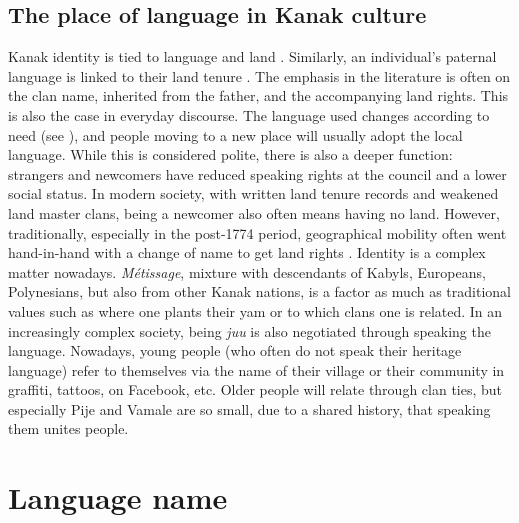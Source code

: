 \subsection{The place of language in Kanak culture}
\label{sec:CultContext}
Kanak identity is tied to language \parencite[29]{lynch_oceanic_2002} and land \parencite[91]{bensa_political_1997}. Similarly, an individual's paternal language is linked to their land tenure \parencite[40]{sallabank_language_2015}. The emphasis in the literature is often on the clan name, inherited from the father, and the accompanying land rights. This is also the case in everyday discourse. The language used changes according to need (see ), and people moving to a new place will usually adopt the local language. While this is considered polite, there is also a deeper function: strangers and newcomers have reduced speaking rights at the council and a lower social status. In modern society, with written land tenure records and weakened land master clans, being a newcomer also often means having no land. However, traditionally, especially in the post-1774 period, geographical mobility often went hand-in-hand with a change of name to get land rights \parencite[92]{bensa_political_1997}.
Identity is a complex matter nowadays. \textit{Métissage},  mixture with descendants of Kabyls, Europeans, Polynesians, but also from other Kanak nations, is a factor as much as traditional values such as where one plants their yam or to which clans one is related. In an increasingly complex society, being \textit{juu}  is also negotiated through speaking the language.
Nowadays, young people (who often do not speak their heritage language) refer to themselves via the name of their village or their community in graffiti, tattoos, on Facebook, etc. Older people will relate through clan ties, but especially Pije and Vamale are so small, due to a shared history, that speaking them unites people.

\section{Language name}
\label{sec:LanguageName}


